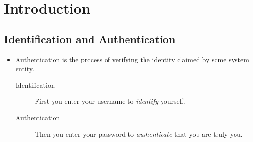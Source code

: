 \begin{frame}
  \titlepage{}
\end{frame}





\section{Introduction}

\subsection{Identification and Authentication}

\begin{frame}
  \begin{itemize}
    \item Authentication is the process of verifying the identity claimed by 
      some system entity.

      \pause{}

      \begin{description}
        \item[Identification] First you enter your username to \emph{identify} 
          yourself.

          \pause{}

        \item[Authentication] Then you enter your password to 
          \emph{authenticate} that you are truly you.
      \end{description}

  \end{itemize}
\end{frame}

